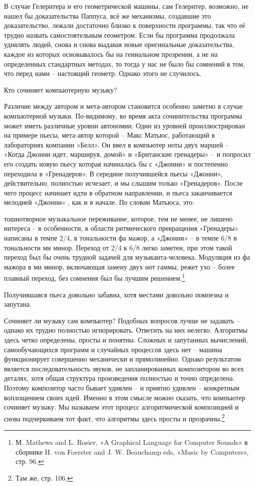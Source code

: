 \documentclass[../main.tex]{subfiles}
\begin{document}
В случае Гелернтера и его геометрической машины, сам Гелернтер, возможно, не нашел бы доказательства Паппуса, всё же механизмы, создавшие это доказательство, лежали достаточно близко к поверхности программы, так что её трудно назвать самостоятельным геометром. Если бы программа продолжала удивлять людей, снова и снова выдавая новые оригинальные доказательства, каждое из которых основывалось бы на гениальном прозрении, а не на определенных стандартных методах, то тогда у нас не было бы сомнений в том, что перед нами \--- настоящий геометр. Однако этого не случилось.

Кто сочиняет компьютерную музыку?

Различие между автором и мета-автором становится особенно заметно в случае компьютерной музыки. По-видимому, во время акта сочинительства программа может иметь различные уровни автономии. Один из уровней проиллюстрирован на примере пьесы, мета-автор которой \--- Макс Матьюс, работающий в лабораториях компании «Белл». Он ввел в компьютер ноты двух маршей \--- «Когда Джонни идет, маршируя, домой» и «Британские гренадеры» \--- и попросил его создать новую пьесу которая начиналась бы с «Джонни» и постепенно переходила в «Гренадеров». В середине получившейся пьесы «Джонни», действительно, полностью исчезает, и мы слышим только «Гренадеров». После чего процесс начинает идти в обратном направлении, и пьеса заканчивается мелодией «Джонни» , как и в начале. По словам Матьюса, это:

тошнотворное музыкальное переживание, которое, тем не менее, не лишено интереса \--- в особенности, в области ритмического превращения «Гренадеры» написаны в темпе 2/4, в тональности фа мажор, а «Джонни» \--- в темпе 6/8 в тональности ми минор. Переход от 2/4 к 6/8 легко заметен, при этом такой переход был бы очень трудной задачей для музыканта-человека. Модуляция из фа мажора в ми минор, включающая замену двух нот гаммы, режет ухо \--- более плавный переход, без сомнения был бы лучшим решением.\footnote{М. Mathews and L. Rosier, «A Graphical Language for Computer Sounds» в сборнике H. von Foerster and J. W. Beauchamp eds, «Music by Computers», стр. 96.}

Получившаяся пьеса довольно забавна, хотя местами довольно помпезна и запутана.

Сочиняет ли музыку сам компьютер? Подобных вопросов лучше не задавать \--- однако их трудно полностью игнорировать. Ответить на них нелегко. Алгоритмы здесь четко определены, просты и понятны. Сложных и запутанных вычислений, самообучающихся программ и случайных процессов здесь нет \--- машина функционирует совершенно механически и прямолинейно. Однако результатом является последовательность звуков, не запланированных композитором во всех деталях, хотя общая структура произведения полностью и точно определена. Поэтому композитор часто бывает удивлен \--- и приятно удивлен \--- конкретным воплощением своих идей. Именно в этом смысле можно сказать, что компьютер сочиняет музыку. Мы называем этот процесс алгоритмической композицией и снова подчеркиваем тот факт, что алгоритмы здесь просты и прозрачны.\footnote{Там же, стр. 106.}
\end{document}
